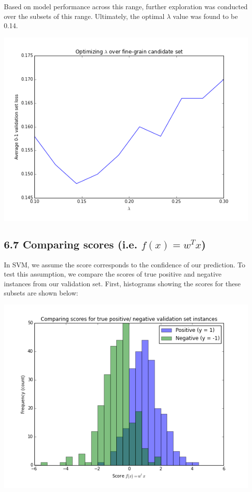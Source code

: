 \documentclass[paper=a4, fontsize=11pt]{scrartcl} %
\numberwithin{equation}{section} %
\numberwithin{figure}{section} %
\numberwithin{table}{section} %
\begin{document}
Based on model performance across this range, further exploration was conducted over the subsets of this range. Ultimately, the optimal $\lambda$ value was found to be 0.14.

\includegraphics[scale = 0.65] {./../figures/6_6_b.png}

\subsection*{6.7 Comparing scores (i.e. $f(x) = w^T x$)}

In SVM, we assume the score corresponds to the confidence of our prediction. To test this assumption, we compare the scores of true positive and negative instances from our validation set. First, histograms showing the scores for these subsets are shown below:

\includegraphics[scale = 0.65] {./../figures/6_7_a.png} 
\end{document}
